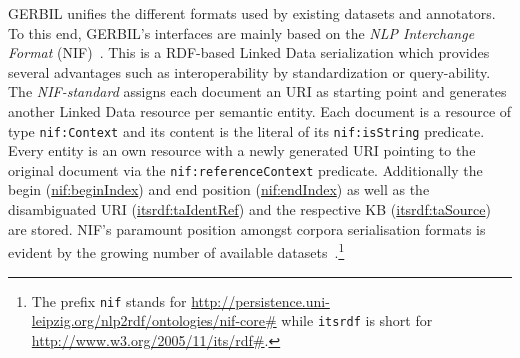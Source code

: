 GERBIL unifies the different formats used by existing datasets and annotators.
To this end, GERBIL's interfaces are mainly based on the \emph{NLP Interchange Format} (NIF)~\cite{ISWC2013NIF}.
This is a \ac{RDF}-based Linked Data serialization which provides several advantages such as interoperability by standardization or query-ability.
The \emph{NIF-standard} assigns each document an URI as starting point and generates another Linked Data resource per semantic entity.
Each document is a resource of type \texttt{nif:Context} and its content is the literal of its \texttt{nif:isString} predicate. 
Every entity is an own resource with a newly generated URI pointing to the original document via the \texttt{nif:referenceContext} predicate.
Additionally the begin (\url{nif:beginIndex}) and end position (\url{nif:endIndex}) as well as the disambiguated URI (\url{itsrdf:taIdentRef}) and the respective KB (\url{itsrdf:taSource}) are stored.
NIF's paramount position amongst corpora serialisation formats is evident by the growing number of available datasets~\cite{GERBIL}.\footnote{The prefix \texttt{nif} stands for \url{http://persistence.uni-leipzig.org/nlp2rdf/ontologies/nif-core\#} while \texttt{itsrdf} is short for \url{http://www.w3.org/2005/11/its/rdf\#}.}

%

